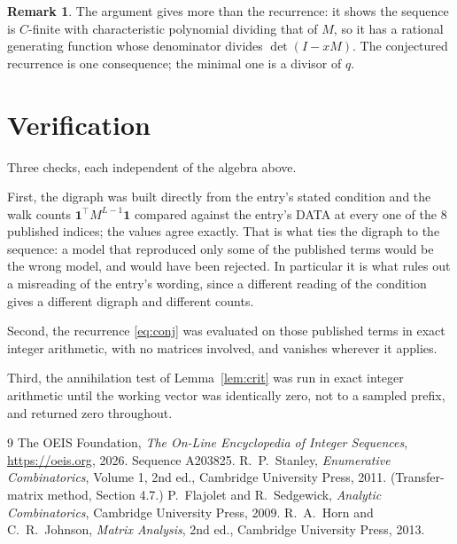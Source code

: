 \documentclass[11pt,a4paper]{article}
\theoremstyle{plain}
\theoremstyle{definition}
\newtheorem{remark}[theorem]{Remark}
\begin{document}
\begin{remark}
The argument gives more than the recurrence: it shows the sequence is $C$-finite with
characteristic polynomial dividing that of $M$, so it has a rational generating function
whose denominator divides $\det(I-xM)$. The conjectured recurrence is one consequence; the
minimal one is a divisor of $q$.
\end{remark}

\section{Verification}

Three checks, each independent of the algebra above.

First, the digraph was built directly from the entry's stated condition and the walk counts
$\mathbf{1}^{\!\top}M^{L-1}\mathbf{1}$ compared against the entry's DATA at
every one of the $8$ published indices; the values agree exactly. That is what ties
the digraph to the sequence: a model that reproduced only some of the published terms would
be the wrong model, and would have been rejected. In particular it is what rules out a
misreading of the entry's wording, since a different reading of the condition gives a
different digraph and different counts.

Second, the recurrence \eqref{eq:conj} was evaluated on those published terms in exact
integer arithmetic, with no matrices involved, and vanishes wherever it applies.

Third, the annihilation test of Lemma~\ref{lem:crit} was run in exact integer arithmetic
until the working vector was identically zero, not to a sampled prefix, and returned zero
throughout.

\begin{thebibliography}{9}
 The OEIS Foundation, \emph{The On-Line Encyclopedia of Integer
Sequences}, \url{https://oeis.org}, 2026. Sequence A203825.
 R.~P.~Stanley, \emph{Enumerative Combinatorics}, Volume 1, 2nd ed.,
Cambridge University Press, 2011. (Transfer-matrix method, Section 4.7.)
 P.~Flajolet and R.~Sedgewick, \emph{Analytic Combinatorics}, Cambridge
University Press, 2009.
 R.~A.~Horn and C.~R.~Johnson, \emph{Matrix Analysis}, 2nd ed., Cambridge
University Press, 2013.
\end{thebibliography}
\end{document}
